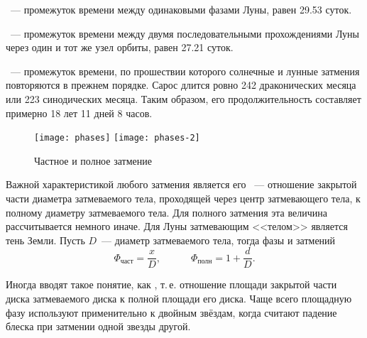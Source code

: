 ~--- промежуток времени между одинаковыми фазами Луны, равен 29.53 суток.

~--- промежуток времени между двумя последовательными прохождениями Луны через один и тот же узел орбиты, равен 27.21 суток.

~--- промежуток  времени, по прошествии которого солнечные и 
лунные затмения повторяются в прежнем порядке. Сарос длится ровно 242 драконических месяца или 223 синодических месяца. Таким образом, его продолжительность  составляет примерно 18 лет 11 дней 8 часов.

\begin{wrapfigure}[8]{r}{.42\tw}
	\centering
	\vspace{-.5pc}
	\texttt{[image: phases]}
	\hfill
	\texttt{[image: phases-2]}
	\caption{Частное и полное затмение}
	\label{fig:part-eclipses-scheme}
\end{wrapfigure}
Важной характеристикой любого затмения является его ~--- отношение закрытой части диаметра затмеваемого тела, проходящей через центр затмевающего тела, к полному диаметру затмеваемого тела. Для полного затмения эта величина рассчитывается немного иначе. Для Луны затмевающим <<телом>> является тень Земли. Пусть $D$~--- диаметр затмеваемого тела, тогда фазы  и  затмений
\begin{equation}
\Phi_{\text{част}} = \frac{x}{D}, \quad \quad \quad \Phi_{\text{полн}} = 1 + \frac{d}{D}.
\end{equation}

Иногда вводят такое понятие, как , т.\,е. отношение площади закрытой части диска затмеваемого диска к полной площади его диска. Чаще всего  площадную фазу используют применительно к двойным звёздам, когда считают падение блеска при затмении одной звезды другой.
